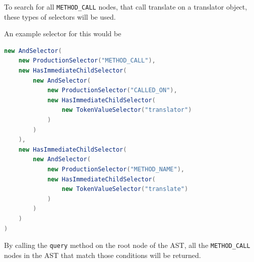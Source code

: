 To search for all \verb|METHOD_CALL| nodes, that call translate on a translator object, these types of selectors will be used.

An example selector for this would be

\begin{lstlisting}[language=Java, caption=Selector example]
new AndSelector(
	new ProductionSelector("METHOD_CALL"),
	new HasImmediateChildSelector(
		new AndSelector(
			new ProductionSelector("CALLED_ON"),
			new HasImmediateChildSelector(
				new TokenValueSelector("translator")
			)
		)
	),
	new HasImmediateChildSelector(
		new AndSelector(
			new ProductionSelector("METHOD_NAME"),
			new HasImmediateChildSelector(
				new TokenValueSelector("translate")
			)
		)
	)
)
\end{lstlisting}

By calling the \verb|query| method on the root node of the AST, all the \verb|METHOD_CALL| nodes in the AST that match those conditions will be returned.
